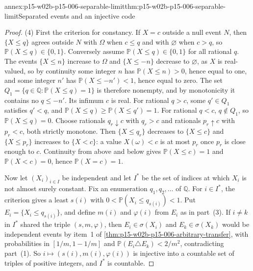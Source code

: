 \begin{annexitem}{annex:p15-w02b-p15-006-separable-limit}{thm:p15-w02b-p15-006-separable-limit}{Separated events and an injective code}
\begin{proof}
(4) First the criterion for constancy. If \(X=c\) outside a null event
\(N\), then \(\{X\leq q\}\) agrees outside \(N\) with \(\Omega\) when
\(c\leq q\) and with \(\varnothing\) when \(c>q\), so
\(\mathbb P(X\leq q)\in\{0,1\}\). Conversely assume
\(\mathbb P(X\leq q)\in\{0,1\}\) for all rational \(q\). The events
\(\{X\leq n\}\) increase to \(\Omega\) and \(\{X\leq-n\}\) decrease to
\(\varnothing\), as \(X\) is real-valued, so by continuity some integer
\(n\) has \(\mathbb P(X\leq n)>0\), hence equal to one, and some integer
\(n'\) has \(\mathbb P(X\leq-n')<1\), hence equal to zero. The set
\(Q_1=\{q\in\mathbb Q:\mathbb P(X\leq q)=1\}\) is therefore nonempty, and
by monotonicity it contains no \(q\leq-n'\). Its infimum \(c\) is real.
For rational \(q>c\), some \(q'\in Q_1\) satisfies \(q'<q\), and
\(\mathbb P(X\leq q)\geq\mathbb P(X\leq q')=1\). For rational \(q<c\),
\(q\notin Q_1\), so \(\mathbb P(X\leq q)=0\). Choose rationals
\(q_r\downarrow c\) with \(q_r>c\) and rationals \(p_r\uparrow c\) with
\(p_r<c\), both strictly monotone. Then \(\{X\leq q_r\}\) decreases to
\(\{X\leq c\}\) and \(\{X\leq p_r\}\) increases to \(\{X<c\}\): a value
\(X(\omega)<c\) is at most \(p_r\) once \(p_r\) is close enough to
\(c\). Continuity from above and below gives \(\mathbb P(X\leq c)=1\)
and \(\mathbb P(X<c)=0\), hence \(\mathbb P(X=c)=1\).

Now let \((X_i)_{i\in I}\) be independent and let \(I^*\) be the set of
indices at which \(X_i\) is not almost surely constant. Fix an
enumeration \(q_1,q_2,\ldots\) of \(\mathbb Q\). For \(i\in I^*\), the
criterion gives a least \(s(i)\) with
\(0<\mathbb P(X_i\leq q_{s(i)})<1\). Put
\(E_i=\{X_i\leq q_{s(i)}\}\), and define \(m(i)\) and \(\varphi(i)\)
from \(E_i\) as in part~(3). If \(i\neq k\) in \(I^*\) shared the
triple \((s,m,\varphi)\), then \(E_i\in\sigma(X_i)\) and
\(E_k\in\sigma(X_k)\) would be independent events by item~1 of
\cref{thm:p15-w02b-p15-006-arbitrary-transfer}, with probabilities in
\([1/m,1-1/m]\) and \(\mathbb P(E_i\triangle E_k)<2/m^2\), contradicting
part~(1). So \(i\mapsto(s(i),m(i),\varphi(i))\) is injective into a
countable set of triples of positive integers, and \(I^*\) is
countable.
\end{proof}
\end{annexitem}

